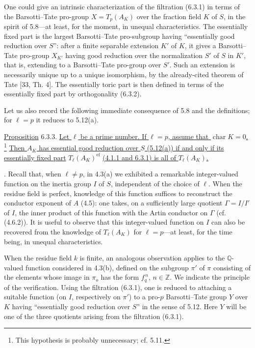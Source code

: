 One could give an intrinsic characterization of the filtration (6.3.1)
in terms of the Barsotti--Tate pro-group $X=T_p(A_K)$ over the fraction
field $K$ of $S$, in the spirit of 5.8---at least, for the moment, in
unequal characteristics.  The essentially fixed part is the largest
Barsotti--Tate pro-subgroup having ``essentially good reduction over
$S$'': after a finite separable extension $K'$ of $K$, it gives a
Barsotti--Tate pro-group $X_{K'}$ having good reduction over the
normalization $S'$ of $S$ in $K'$, that is, extending to a
Barsotti--Tate pro-group over $S'$.  Such an extension is necessarily
unique up to a unique isomorphism, by the already-cited theorem of Tate
[33, Th. 4].  The essentially toric part is then defined in terms of
the essentially fixed part by orthogonality (6.3.2).

Let us also record the following immediate consequence of 5.8 and the
definitions; for $\ell=p$ it reduces to 5.12(a).

\medskip
\noindent
\underline{Proposition} 6.3.3. \underline{Let $\ell$ be a prime
number.  If $\ell=p$, assume that $\operatorname{char}K=0$.}
\footnote{This hypothesis is probably unnecessary; cf. 5.11.}
\underline{Then $A_K$ has essential good reduction over $S$ (5.12(a))
if and only if its essentially fixed part}
$T_\ell(A_K)^{\mathrm{ef}}$
\underline{(4.1.1 and 6.3.1) is all of $T_\ell(A_K)$.}

\medskip
{}. Recall that, when $\ell\neq p$, in 4.3(a) we exhibited a
remarkable integer-valued function on the inertia group $I$ of $S$,
independent of the choice of $\ell$.  When the residue field is perfect,
knowledge of this function suffices to reconstruct the conductor
exponent of $A$ (4.5): one takes, on a sufficiently large quotient
$\Gamma=I/I'$ of $I$, the inner product of this function with the Artin
conductor on $\Gamma$ (cf. (4.6.2)).  It is useful to observe that this
integer-valued function on $I$ can also be recovered from the knowledge
of $T_\ell(A_K)$ for $\ell=p$---at least, for the time being, in unequal
characteristics.

When the residue field $k$ is finite, an analogous observation applies
to the $\mathbb Q$-valued function considered in 4.3(b), defined on the
subgroup $\pi'$ of $\pi$ consisting of the elements whose image in
$\pi_o$ has the form $f_q^{\,n}$, $n\in\mathbb Z$.  We indicate the
principle of the verification.  Using the filtration (6.3.1), one is
reduced to attaching a suitable function (on $I$, respectively on
$\pi'$) to a pro-$p$ Barsotti--Tate group $Y$ over $K$ having
``essentially good reduction over $S$'' in the sense of 5.12.  Here $Y$
will be one of the three quotients arising from the filtration (6.3.1).

